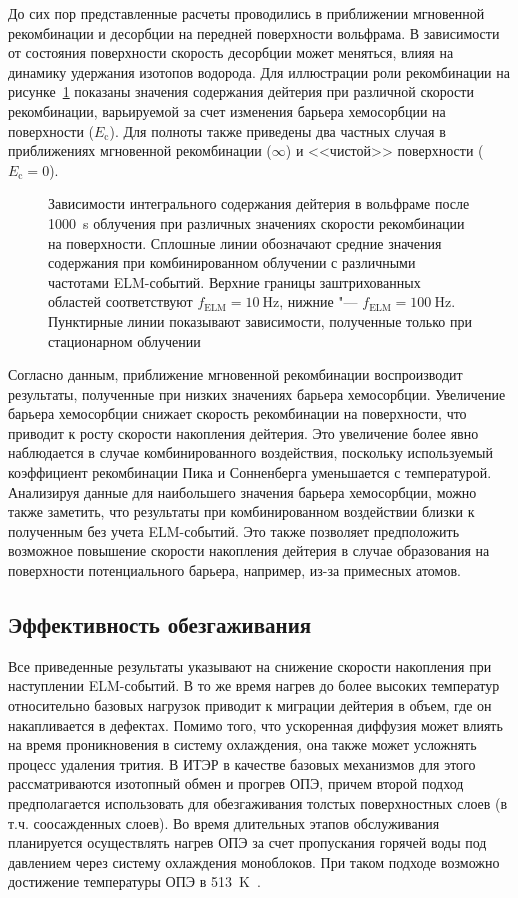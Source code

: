 До сих пор представленные расчеты проводились в приближении мгновенной рекомбинации и десорбции на передней поверхности вольфрама. В зависимости от состояния поверхности скорость десорбции может меняться, влияя на динамику удержания изотопов водорода. Для иллюстрации роли рекомбинации на рисунке~\cref{fig:ch3/rec_var} показаны значения содержания дейтерия при различной скорости рекомбинации, варьируемой за счет изменения барьера хемосорбции на поверхности ($E_{\mathrm{c}}$). Для полноты также приведены два частных случая в приближениях мгновенной рекомбинации ($\infty$) и <<чистой>> поверхности ($E_{\mathrm{c}}=0$).

\begin{figure}[ht]
	\caption{Зависимости интегрального содержания дейтерия в вольфраме после \SI{1000}{\second} облучения при различных значениях скорости рекомбинации на поверхности. Сплошные линии обозначают средние значения содержания при комбинированном облучении с различными частотами ELM-событий. Верхние границы заштрихованных областей соответствуют \(f_\mathrm{ELM} = \SI{10}{\hertz}\), нижние "--- \(f_\mathrm{ELM} = \SI{100}{\hertz}\). Пунктирные линии показывают зависимости, полученные только при стационарном облучении}\label{fig:ch3/rec_var}
\end{figure}

Согласно данным, приближение мгновенной рекомбинации воспроизводит результаты, полученные при низких значениях барьера хемосорбции. Увеличение барьера хемосорбции снижает скорость рекомбинации на поверхности, что приводит к росту скорости накопления дейтерия. Это увеличение более явно наблюдается в случае комбинированного воздействия, поскольку используемый коэффициент рекомбинации Пика и Сонненберга уменьшается с температурой. Анализируя данные для наибольшего значения барьера хемосорбции, можно также заметить, что результаты при комбинированном воздействии близки к полученным без учета ELM-событий. Это также позволяет предположить возможное повышение скорости накопления дейтерия в случае образования на поверхности потенциального барьера, например, из-за примесных атомов.

\subsection{Эффективность обезгаживания}

Все приведенные результаты указывают на снижение скорости накопления при наступлении ELM-событий. В то же время нагрев до более высоких температур относительно базовых нагрузок приводит к миграции дейтерия в объем, где он накапливается в дефектах. Помимо того, что ускоренная диффузия может влиять на время проникновения в систему охлаждения, она также может усложнять процесс удаления трития. В ИТЭР в качестве базовых механизмов для этого рассматриваются изотопный обмен и прогрев ОПЭ, причем второй подход предполагается использовать для обезгаживания толстых поверхностных слоев (в т.ч. соосажденных слоев). Во время длительных этапов обслуживания планируется осуществлять нагрев ОПЭ за счет пропускания горячей воды под давлением через систему охлаждения моноблоков. При таком подходе возможно достижение температуры ОПЭ в \SI{513}{\kelvin}~\cite{Pitts2025}.

